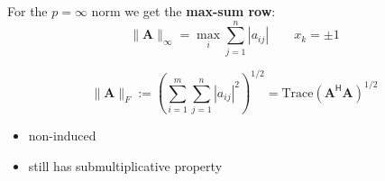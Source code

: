 For the $p = \infty$ norm we get the \textbf{max-sum row}:
\begin{equation*}
    \|\mathbf{A}\|_\infty=\max_i\sum_{j=1}^n|a_{ij}|\qquad x_k=\pm 1
\end{equation*}


\begin{equation*}
    \|\mathbf{A}\|_F:={\left(\sum_{i=1}^m\sum_{j=1}^n|a_{ij}|^2\right)}^{1/2}=\text{Trace}{(\mathbf{A}^{\mathsf{H}}\mathbf{A})}^{1/2}
\end{equation*}

\begin{itemize}
    \item non-induced
    \item still has submultiplicative property
\end{itemize}
